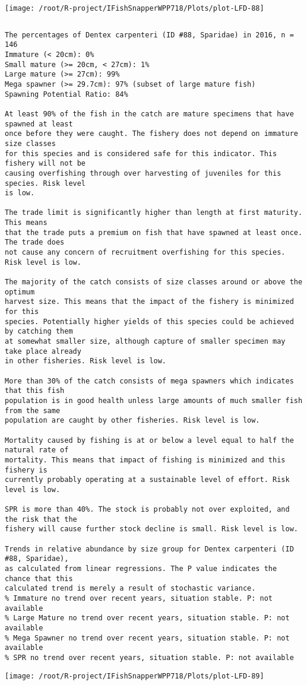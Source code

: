\documentclass{report}\usepackage[]{graphicx}\usepackage[]{color}
\makeatletter
\def\maxwidth{ %
  \ifdim\Gin@nat@width>\linewidth
    \linewidth
  \else
    \Gin@nat@width
  \fi
}
\newenvironment{kframe}{%
 \def\at@end@of@kframe{}%
 \ifinner\ifhmode%
  \def\at@end@of@kframe{\end{minipage}}%
  \begin{minipage}{\columnwidth}%
 \fi\fi%
 \def\FrameCommand##1{\hskip\@totalleftmargin \hskip-\fboxsep
 \colorbox{shadecolor}{##1}\hskip-\fboxsep
     \hskip-\linewidth \hskip-\@totalleftmargin \hskip\columnwidth}%
 \MakeFramed {\advance\hsize-\width
   \@totalleftmargin\z@ \linewidth\hsize
   \@setminipage}}%
 {\par\unskip\endMakeFramed%
 \at@end@of@kframe}
\newenvironment{knitrout}{}{} %
\makeatother
\begin{document}
\begin{knitrout}
\texttt{[image: /root/R-project/IFishSnapperWPP718/Plots/plot-LFD-88]} 
\begin{kframe}\begin{verbatim}
\end{verbatim}
\end{kframe}
\clearpage
\newpage
\begin{kframe}\begin{verbatim}The percentages of Dentex carpenteri (ID #88, Sparidae) in 2016, n = 146
Immature (< 20cm): 0%
Small mature (>= 20cm, < 27cm): 1%
Large mature (>= 27cm): 99%
Mega spawner (>= 29.7cm): 97% (subset of large mature fish)
Spawning Potential Ratio: 84%
 
At least 90% of the fish in the catch are mature specimens that have spawned at least
once before they were caught. The fishery does not depend on immature size classes
for this species and is considered safe for this indicator. This fishery will not be
causing overfishing through over harvesting of juveniles for this species. Risk level
is low.

The trade limit is significantly higher than length at first maturity.  This means
that the trade puts a premium on fish that have spawned at least once. The trade does
not cause any concern of recruitment overfishing for this species. Risk level is low.

The majority of the catch consists of size classes around or above the optimum
harvest size. This means that the impact of the fishery is minimized for this
species. Potentially higher yields of this species could be achieved by catching them
at somewhat smaller size, although capture of smaller specimen may take place already
in other fisheries. Risk level is low.

More than 30% of the catch consists of mega spawners which indicates that this fish
population is in good health unless large amounts of much smaller fish from the same
population are caught by other fisheries. Risk level is low.
 
Mortality caused by fishing is at or below a level equal to half the natural rate of
mortality. This means that impact of fishing is minimized and this fishery is
currently probably operating at a sustainable level of effort. Risk level is low.
 
SPR is more than 40%. The stock is probably not over exploited, and the risk that the
fishery will cause further stock decline is small. Risk level is low.
 
Trends in relative abundance by size group for Dentex carpenteri (ID #88, Sparidae),
as calculated from linear regressions. The P value indicates the chance that this
calculated trend is merely a result of stochastic variance.
% Immature no trend over recent years, situation stable. P: not available
% Large Mature no trend over recent years, situation stable. P: not available
% Mega Spawner no trend over recent years, situation stable. P: not available
% SPR no trend over recent years, situation stable. P: not available
\end{verbatim}
\end{kframe}
\texttt{[image: /root/R-project/IFishSnapperWPP718/Plots/plot-LFD-89]} 


\end{knitrout}
\end{document}
